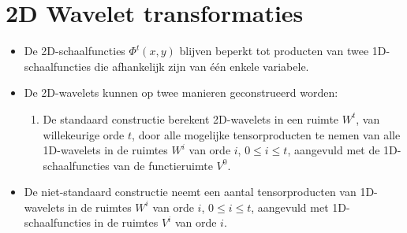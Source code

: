\documentclass{report}
\begin{document}
\section{2D Wavelet transformaties }
\begin{enumerate}
	{
		\begin{itemize} 
			\item De 2D-schaalfuncties $\Phi^t(x, y)$ blijven beperkt tot producten van twee 1D-schaalfuncties die afhankelijk zijn van één enkele variabele.
			\item De 2D-wavelets kunnen op twee manieren geconstrueerd worden:
			\begin{enumerate}
				\item De standaard constructie berekent 2D-wavelets in een ruimte $W^t$, van willekeurige orde $t$, door alle mogelijke tensorproducten te nemen van alle 1D-wavelets in de ruimtes $W^i$ van orde $i$, $0 \leq i \leq t$, aangevuld met de 1D-schaalfuncties van de functieruimte $V^0$.
			\end{enumerate}
				\item De niet-standaard constructie neemt een aantal tensorproducten van 1D-wavelets in de ruimtes $W^i$ van orde $i$, $0\leq i\leq t$, aangevuld met 1D-schaalfuncties in de ruimtes $V^i$ van orde $i$.
		\end{itemize}
	}
			
\end{enumerate}
\end{document}
